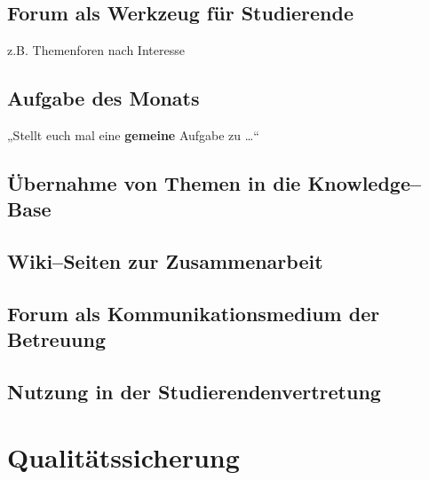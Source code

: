 \subsection{Forum als Werkzeug für Studierende} %
\label{sub:forum_als_werkzeug_fur_studierende}
z.B. Themenforen nach Interesse

\subsection{Aufgabe des Monats} %
\label{sub:aufgabe_des_monats}

„Stellt euch mal eine \textbf{gemeine} Aufgabe zu …“

\subsection{Übernahme von Themen in die Knowledge--Base} %
\label{sub:ubernahme_von_themen_in_die_knowledge_base}


\subsection{Wiki--Seiten zur Zusammenarbeit} %
\label{sub:wiki_seiten_zur_zusammenarbeit}


\subsection{Forum als Kommunikationsmedium der Betreuung} %
\label{sub:forum_als_kommunikationsmedium_der_betreuung}


\subsection{Nutzung in der Studierendenvertretung} %
\label{sub:nutzung_in_der_studierendenvertretung}



\section{Qualitätssicherung} %
\label{sec:qualitatssicherung}

